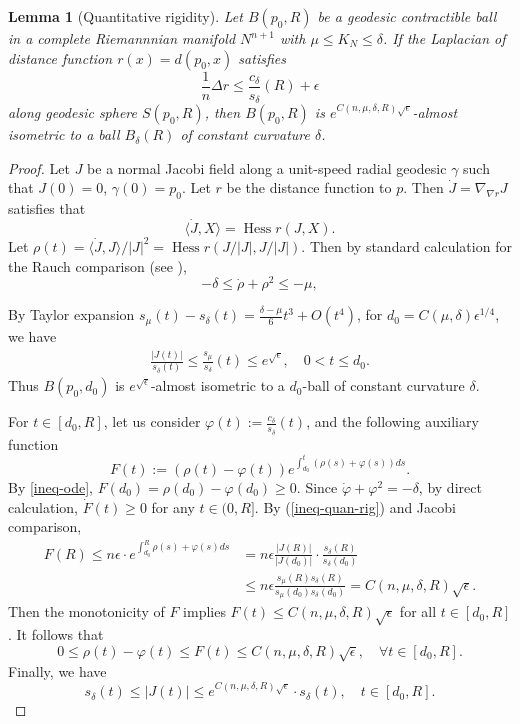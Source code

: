 \documentclass{amsart}
\numberwithin{equation}{section}
\newtheorem{lem}[theo]{Lemma}
\theoremstyle{remark}
\renewcommand{\(}{\left(}
\renewcommand{\)}{\right)}
\renewcommand{\~}{\tilde}
\renewcommand{\-}{\overline}
\renewcommand{\d}{\delta}
\begin{document}
\begin{lem}[Quantitative rigidity]\label{lem-quantitative-rigidity}
	Let $B(p_0,R)$ be a geodesic contractible ball in a complete Riemannnian manifold $N^{n+1}$ with $\mu\le K_N\le \d$. If the Laplacian of distance function $r(x)=d(p_0,x)$ satisfies
	\begin{equation}\label{ineq-quan-rig}
	\frac{1}{n}\Delta r\le \frac{c_\d}{s_\d}(R)+\epsilon
	\end{equation}
	along geodesic sphere $S(p_0,R)$, then $B(p_0,R)$ is $e^{C(n,\mu,\d,R) \sqrt{\epsilon}}$-almost isometric to a ball $B_\d(R)$ of constant curvature $\d$.
\end{lem}
\begin{proof}
	
	Let $J$ be a normal Jacobi field along a unit-speed radial geodesic $\gamma$ such that $J(0)=0$, $\gamma(0)=p_0$. Let $r$ be the distance function to $p$. Then $\dot{J}=\nabla_{\nabla r}J$ satisfies that
	$$\langle   \dot{J},X\rangle =\operatorname{Hess}r(J,X).$$
	Let $\rho(t)=\langle  \dot{J},J\rangle /|J|^2=\operatorname{Hess}r(J/|J|,J/|J|)$. Then by standard calculation for the Rauch comparison (see \cite[Theorem 6.4.3]{Petersen2016}),
	\begin{equation}\label{ineq-ode}
	-\d\le \dot{\rho}+\rho^2\le -\mu,
	\end{equation}
	
	
	By Taylor expansion $s_\mu(t)-s_\d(t)=\frac{\d-\mu}{6}t^3 +O(t^4)$,
	for $d_0=C(\mu,\d)\epsilon^{1/4}$, we have
	\begin{align*}
	\frac{|J(t)|}{s_\d(t)}\leq  \frac{s_\mu}{s_\d}(t) \leq e^{\sqrt{\epsilon}}, \quad 0<t\leq d_0.
	\end{align*}
	Thus $B(p_0,d_0)$ is $e^{\sqrt{\epsilon}}$-almost isometric to a $d_0$-ball of constant curvature $\d$.
	
	
	For $t\in [d_0,R]$, 
	let us consider  $\varphi(t):=\frac{c_\d}{s_\d}(t)$,  and the following auxiliary function
	\begin{equation}\label{func-quantitative-warped}
	F(t):=(\rho(t)-\varphi(t))e^{\int_{d_0}^t(\rho(s)+\varphi(s))ds}.
	\end{equation}
	By \eqref{ineq-ode},  $F(d_0)=\rho(d_0)-\varphi(d_0)\geq 0$.
	Since $\dot{\varphi}+\varphi^2=-\d$, by direct calculation, $\dot{F}(t)\ge 0$ for any $t\in (0,R]$.
	By (\ref{ineq-quan-rig}) and Jacobi comparison, 
	$$
	\begin{aligned}
	F(R) \le n \epsilon \cdot e^{\int_{d_0}^{R} \rho(s)+\varphi(s)ds}&=n\epsilon \frac{|J(R)|}{|J(d_0)|}\cdot \frac{s_\d(R)}{s_\d(d_0)}\\
	&\le n \epsilon \frac{s_\mu(R) s_\d(R)}{s_\mu(d_0)s_\d(d_0)} = C(n,\mu,\d,R)\sqrt{\epsilon}.
	\end{aligned}$$
	Then the monotonicity of $F$ implies $F(t)\le C(n,\mu,\d,R)\sqrt{\epsilon}$ for all $t\in [d_0,R]$. It follows that
	$$
	0\leq \rho(t)-\varphi(t) \leq  F(t)  \leq C(n,\mu,\d,R)\sqrt{\epsilon}, \quad \forall t\in [d_0,R].
	$$
	Finally, we have
	$$
	s_\d(t)\le |J(t)|\le e^{C(n,\mu,\d,R) \sqrt{\epsilon}} \cdot s_\d(t), \quad t\in [d_0,R].
	$$
\end{proof}
\end{document}
